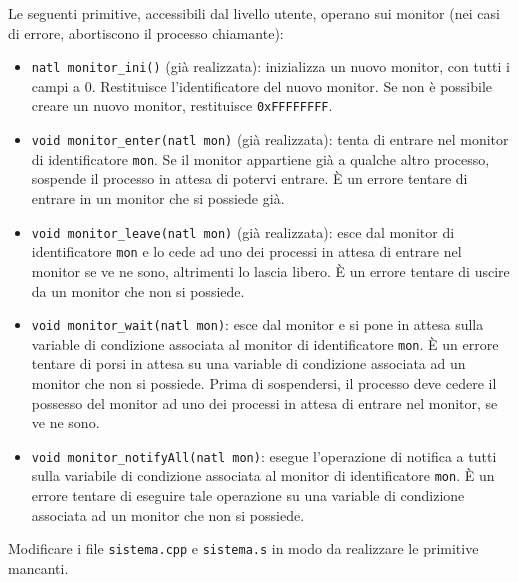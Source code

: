 Le seguenti primitive, accessibili dal livello utente, operano sui
monitor (nei casi di errore, abortiscono il processo chiamante):
\begin{itemize}
\item \verb|natl monitor_ini()| (gi\`a
realizzata): inizializza un nuovo monitor, 
con tutti i campi a 0.
Restituisce l'identificatore del nuovo monitor. Se non
\`e possibile creare un nuovo monitor, restituisce {\tt 0xFFFFFFFF}.
\item \verb|void monitor_enter(natl mon)| (gi\`a
realizzata): tenta di entrare nel monitor di identificatore
{\tt mon}.  Se il monitor appartiene gi\`a a qualche altro processo,
sospende il processo in attesa di potervi entrare.
\`E un errore tentare di entrare in un monitor che si possiede
gi\`a. 
\item \verb|void monitor_leave(natl mon)| (gi\`a realizzata):
esce dal monitor di identificatore {\tt mon} e lo cede ad uno
dei processi in attesa di entrare nel monitor se ve ne sono, altrimenti
lo lascia libero.
\`E un errore tentare di uscire da un monitor che non si possiede.
\item \verb|void monitor_wait(natl mon)|: 
esce dal monitor e si pone in
attesa sulla variable di condizione associata al monitor di identificatore
{\tt mon}.  \`E un errore tentare di porsi in attesa su una variable di
condizione associata ad un monitor che non si possiede.
Prima di sospendersi, il processo deve cedere il possesso del monitor
ad uno dei processi in attesa di entrare nel monitor, se ve ne sono.
\item \verb|void monitor_notifyAll(natl mon)|:
esegue l'operazione di notifica a tutti sulla
variabile di condizione associata al monitor di identificatore {\tt mon}.
\`E un errore tentare di eseguire tale operazione su una variable di
condizione associata ad un monitor che non si possiede.
\end{itemize}

Modificare i file \verb|sistema.cpp| e \verb|sistema.s| in modo da
realizzare le primitive mancanti.

